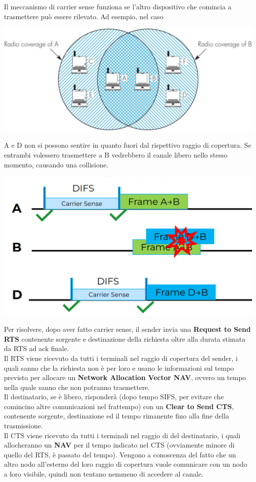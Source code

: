 Il meccanismo di carrier sense funziona se l'altro dispositivo che comincia a trasmettere può essere rilevato. Ad esempio, nel caso
\begin{center}
	\includegraphics[width=0.6\linewidth]{img/wlan/sneaky}
\end{center}
A e D non si possono sentire in quanto fuori dal rispettivo raggio di copertura. Se entrambi volessero trasmettere a B vedrebbero il canale libero nello stesso momento, causando una collisione.
\begin{center}
	\includegraphics[width=0.55\linewidth]{img/wlan/boom}
\end{center}

Per risolvere, dopo aver fatto carrier sense, il sender invia una \textbf{Request to Send RTS} contenente sorgente e destinazione della richiesta oltre alla durata stimata da RTS ad ack finale. \\

Il RTS viene ricevuto da tutti i terminali nel raggio di copertura del sender, i quali sanno che la richiesta non è per loro e usano le informazioni sul tempo previsto per allocare un \textbf{Network Allocation Vector NAV}, ovvero un tempo nella quale sanno che non potranno trasmettere.\\

Il destinatario, se è libero, risponderà (dopo tempo SIFS, per evitare che comincino altre comunicazioni nel frattempo) con un \textbf{Clear to Send CTS}, contenente sorgente, destinazione ed il tempo rimanente fino alla fine della trasmissione.\\

Il CTS viene ricevuto da tutti i terminali nel raggio di del destinatario, i quali allocheranno un \textbf{NAV} per il tempo indicato nel CTS (ovviamente minore di quello del RTS, è passato del tempo). Vengono a conoscenza del fatto che un altro nodo all'esterno del loro raggio di copertura vuole comunicare con un nodo a loro visibile, quindi non tentano nemmeno di accedere al canale.\\

